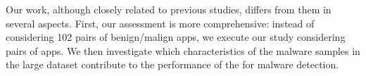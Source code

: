Our work, although closely related to previous studies, differs from them in several aspects.  First, our assessment is more comprehensive: instead of considering 102 pairs of benign/malign apps, we execute our study considering \apps pairs of apps.
We then investigate which characteristics of the malware samples in the large dataset contribute to the performance of the \mas for malware detection.









